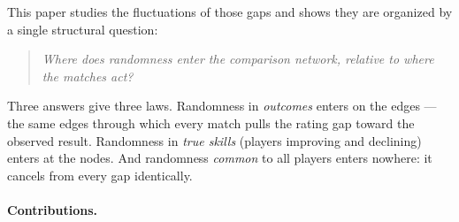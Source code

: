 \documentclass[11pt]{article}
\begin{document}
This paper studies the fluctuations of those gaps and shows they are
organized by a single structural question:
\begin{quote}
\emph{Where does randomness enter the comparison network, relative to
where the matches act?}
\end{quote}
Three answers give three laws. Randomness in \emph{outcomes} enters on the
edges --- the same edges through which every match pulls the rating gap
toward the observed result. Randomness in \emph{true skills} (players
improving and declining) enters at the nodes. And randomness \emph{common}
to all players enters nowhere: it cancels from every gap identically.

\paragraph{Contributions.}
\end{document}
